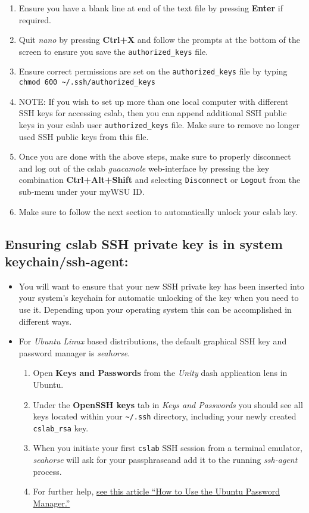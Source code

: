 \documentclass[12pt]{article}
\begin{document}
\begin{flushleft}
\begin{enumerate}
  \item Ensure you have a blank line at end of the text file by pressing \textbf{Enter} if required.
  \item Quit \textit{nano} by pressing \textbf{Ctrl+X} and follow the prompts at the bottom of the screen to ensure you save the \verb|authorized_keys| file.
  \item Ensure correct permissions are set on the \verb|authorized_keys| file by typing \break
    \verb|chmod 600 ~/.ssh/authorized_keys|
  \item NOTE: If you wish to set up more than one local computer with different SSH keys for accessing cslab, then you can append additional SSH public keys in your cslab user \verb|authorized_keys| file. Make sure to remove no longer used SSH public keys from this file.
  \item Once you are done with the above steps, make sure to properly disconnect and log out of the cslab \textit{guacamole} web-interface by pressing the key combination \textbf{Ctrl+Alt+Shift} and selecting \texttt{Disconnect} or \texttt{Logout} from the sub-menu under your myWSU ID.
  \item Make sure to follow the next section to automatically unlock your cslab key.
\end{enumerate}

\subsection*{Ensuring cslab SSH private key is in system keychain/ssh-agent:}
\begin{itemize}
  \item You will want to ensure that your new SSH private key has been inserted into your system's keychain for automatic unlocking of the key when you need to use it. Depending upon your operating system this can be accomplished in different ways.

  \item For \textit{Ubuntu Linux} based distributions, the default graphical SSH key and password manager is \textit{seahorse}.
  \begin{enumerate}
    \item Open \textbf{Keys and Passwords} from the \textit{Unity} dash application lens in Ubuntu.
    \item Under the \textbf{OpenSSH keys} tab in \textit{Keys and Passwords} you should see all keys located within your \verb|~/.ssh| directory, including your newly created \verb|cslab_rsa| key.
    \item When you initiate your first \verb|cslab| SSH session from a terminal emulator, \textit{seahorse} will ask for your passphraseand  add it to the running \textit{ssh-agent} process.
    \item For further help, \href{https://www.lifewire.com/guide-to-seahorse-tool-2196541}{see this article ``How to Use the Ubuntu Password Manager.''}
  \end{enumerate}


\end{itemize}
\end{flushleft}
\end{document}
